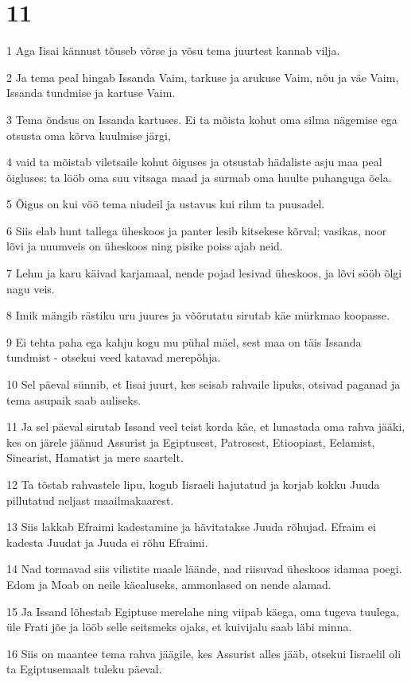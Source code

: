\chapter{11}

\par 1 Aga Iisai kännust tõuseb võrse ja võsu tema juurtest kannab vilja.
\par 2 Ja tema peal hingab Issanda Vaim, tarkuse ja arukuse Vaim, nõu ja väe Vaim, Issanda tundmise ja kartuse Vaim.
\par 3 Tema õndsus on Issanda kartuses. Ei ta mõista kohut oma silma nägemise ega otsusta oma kõrva kuulmise järgi,
\par 4 vaid ta mõistab viletsaile kohut õiguses ja otsustab hädaliste asju maa peal õigluses; ta lööb oma suu vitsaga maad ja surmab oma huulte puhanguga õela.
\par 5 Õigus on kui vöö tema niudeil ja ustavus kui rihm ta puusadel.
\par 6 Siis elab hunt tallega üheskoos ja panter lesib kitsekese kõrval; vasikas, noor lõvi ja nuumveis on üheskoos ning pisike poiss ajab neid.
\par 7 Lehm ja karu käivad karjamaal, nende pojad lesivad üheskoos, ja lõvi sööb õlgi nagu veis.
\par 8 Imik mängib rästiku uru juures ja võõrutatu sirutab käe mürkmao koopasse.
\par 9 Ei tehta paha ega kahju kogu mu pühal mäel, sest maa on täis Issanda tundmist - otsekui veed katavad merepõhja.
\par 10 Sel päeval sünnib, et Iisai juurt, kes seisab rahvaile lipuks, otsivad paganad ja tema asupaik saab auliseks.
\par 11 Ja sel päeval sirutab Issand veel teist korda käe, et lunastada oma rahva jääki, kes on järele jäänud Assurist ja Egiptusest, Patrosest, Etioopiast, Eelamist, Sinearist, Hamatist ja mere saartelt.
\par 12 Ta tõstab rahvastele lipu, kogub Iisraeli hajutatud ja korjab kokku Juuda pillutatud neljast maailmakaarest.
\par 13 Siis lakkab Efraimi kadestamine ja hävitatakse Juuda rõhujad. Efraim ei kadesta Juudat ja Juuda ei rõhu Efraimi.
\par 14 Nad tormavad siis vilistite maale läände, nad riisuvad üheskoos idamaa poegi. Edom ja Moab on neile käealuseks, ammonlased on nende alamad.
\par 15 Ja Issand lõhestab Egiptuse merelahe ning viipab käega, oma tugeva tuulega, üle Frati jõe ja lööb selle seitsmeks ojaks, et kuivijalu saab läbi minna.
\par 16 Siis on maantee tema rahva jäägile, kes Assurist alles jääb, otsekui Iisraelil oli ta Egiptusemaalt tuleku päeval.


